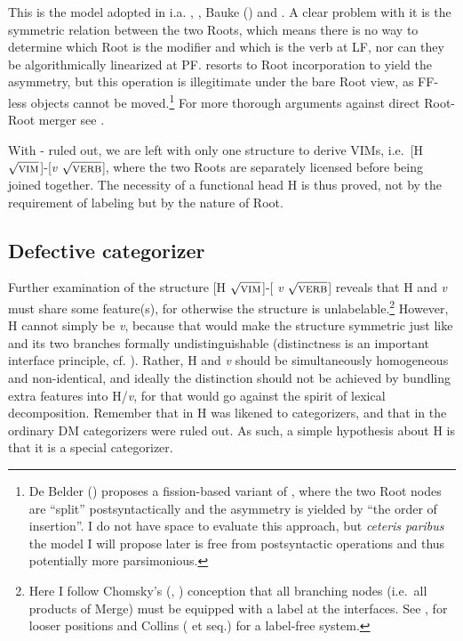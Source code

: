 \documentclass[output=paper]{langsci/langscibook}
\begin{document}
\noindent This is the  model adopted in i.a. \citet{Zhang2007},
\citet{Borer2013}, Bauke (\citeyear{Bauke2014,Bauke2016}) and
\citet{deBeldervanKoppen2016}. A clear problem with it is the symmetric
relation between the two Roots, which means there is no way to determine which
Root is the modifier and which is the verb at \gls{LF}, nor can they be
algorithmically linearized at PF. \citet{Borer2013} resorts to Root
incorporation to yield the asymmetry, but this operation is illegitimate under
the bare Root view, as FF-less objects cannot be moved.\footnote{De Belder
(\citeyear{deBelder2017}) proposes a fission-based variant of ,
where the two Root nodes are ``split'' postsyntactically and the asymmetry is
yielded by ``the order of insertion''. I do not have space to evaluate this
approach, but \emph{ceteris paribus} the model I will propose later is free
from postsyntactic operations and thus potentially more parsimonious.} For more
thorough arguments against direct Root-Root merger see \citet{Song2017roots}.

With - ruled out, we are left with only one structure
to derive \glspl{VIM}, i.e.\ [H {$\sqrt{\textrm{\textsc{vim}}}$}]-[{\em v}
{$\sqrt{\textrm{\textsc{verb}}}$}], where the two Roots are separately licensed
before being joined together. The necessity of a functional head H is thus
proved, not by the requirement of labeling but by the nature of Root.

\subsection{Defective categorizer}\label{sec4.2}

Further examination of the structure [H {$\sqrt{\textrm{\textsc{vim}}}$}]-[{\em
v} {$\sqrt{\textrm{\textsc{verb}}}$}] reveals that H and {\em v} must share
some feature(s), for otherwise the structure is unlabelable.\footnote{Here I
follow Chomsky's (\citeyear{Chomsky2013}, \citeyear{Chomsky2015}) conception
that all branching nodes (i.e.\ all products of Merge) must be equipped with a
label at the interfaces. See \citet{Boskovic2016tlr}, \citet{BaukeRoeper2017} for
looser positions and Collins (\citeyear{Collins2002} et seq.) for a label-free
system.} However, H cannot simply be {\em v}, because that would make the
structure symmetric just like  and its two branches formally
undistinguishable (distinctness is an important interface principle, cf.
\citealt{Richards2010}). Rather, H and {\em v} should be simultaneously
homogeneous and non-identical, and ideally the distinction should not be
achieved by bundling extra features into H/{\em v}, for that would go against
the spirit of lexical decomposition. Remember that in  H was likened
to categorizers, and that in  the ordinary \gls{DM} categorizers were
ruled out. As such, a simple hypothesis about H is that it is a special
categorizer.
\end{document}
